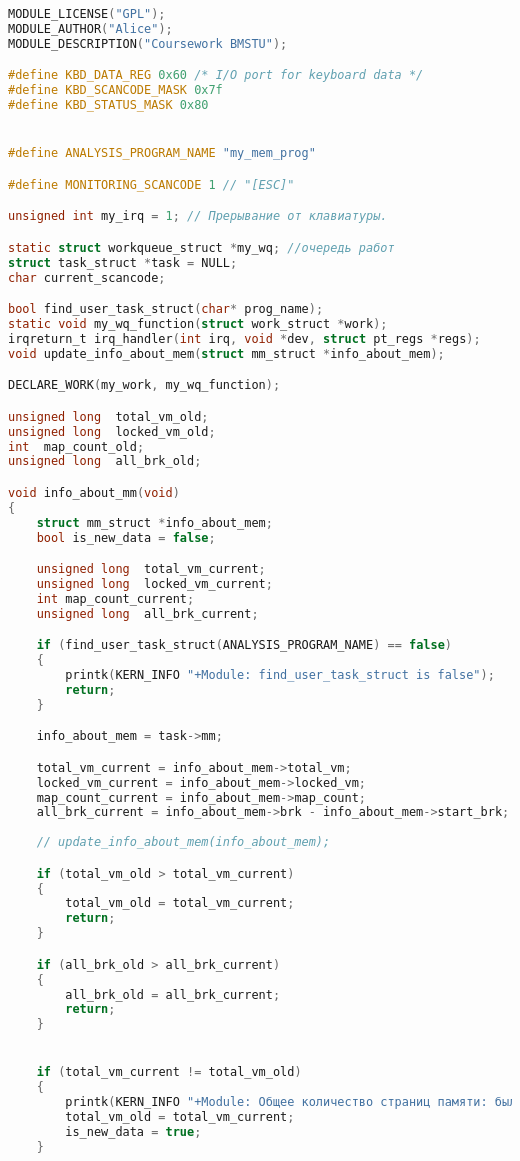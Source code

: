 \begin{lstlisting}[language=c, label=some-code, caption=Загружаемый модуль ядра]
MODULE_LICENSE("GPL");
MODULE_AUTHOR("Alice");
MODULE_DESCRIPTION("Coursework BMSTU");

#define KBD_DATA_REG 0x60 /* I/O port for keyboard data */
#define KBD_SCANCODE_MASK 0x7f
#define KBD_STATUS_MASK 0x80


#define ANALYSIS_PROGRAM_NAME "my_mem_prog"

#define MONITORING_SCANCODE 1 // "[ESC]"

unsigned int my_irq = 1; // Прерывание от клавиатуры.

static struct workqueue_struct *my_wq; //очередь работ
struct task_struct *task = NULL;
char current_scancode;

bool find_user_task_struct(char* prog_name);
static void my_wq_function(struct work_struct *work);
irqreturn_t irq_handler(int irq, void *dev, struct pt_regs *regs);
void update_info_about_mem(struct mm_struct *info_about_mem);

DECLARE_WORK(my_work, my_wq_function);

unsigned long  total_vm_old;
unsigned long  locked_vm_old;
int  map_count_old;
unsigned long  all_brk_old;

void info_about_mm(void)
{
	struct mm_struct *info_about_mem; 
	bool is_new_data = false;

	unsigned long  total_vm_current;
	unsigned long  locked_vm_current;
	int map_count_current;
	unsigned long  all_brk_current;

	if (find_user_task_struct(ANALYSIS_PROGRAM_NAME) == false)
	{
		printk(KERN_INFO "+Module: find_user_task_struct is false");
		return;
	}

	info_about_mem = task->mm;

	total_vm_current = info_about_mem->total_vm;
	locked_vm_current = info_about_mem->locked_vm;
	map_count_current = info_about_mem->map_count;
	all_brk_current = info_about_mem->brk - info_about_mem->start_brk;
	
	// update_info_about_mem(info_about_mem);

	if (total_vm_old > total_vm_current)
	{
		total_vm_old = total_vm_current;
		return;
	}

	if (all_brk_old > all_brk_current)
	{
		all_brk_old = all_brk_current;
		return;
	}


	if (total_vm_current != total_vm_old)
	{
		printk(KERN_INFO "+Module: Общее количество страниц памяти: было: %lu; стало:%lu; разница:%lu", total_vm_old, total_vm_current, total_vm_current - total_vm_old);
		total_vm_old = total_vm_current;
		is_new_data = true;
	}


\end{lstlisting}
